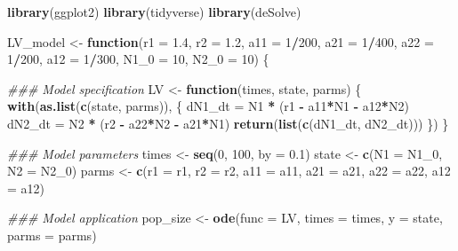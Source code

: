 \documentclass[
]{book}
\newenvironment{Shaded}{\begin{snugshade}}{\end{snugshade}}
\newcommand{\CommentTok}[1]{\textcolor[rgb]{0.56,0.35,0.01}{\textit{#1}}}
\newcommand{\ControlFlowTok}[1]{\textcolor[rgb]{0.13,0.29,0.53}{\textbf{#1}}}
\newcommand{\DataTypeTok}[1]{\textcolor[rgb]{0.13,0.29,0.53}{#1}}
\newcommand{\DecValTok}[1]{\textcolor[rgb]{0.00,0.00,0.81}{#1}}
\newcommand{\FloatTok}[1]{\textcolor[rgb]{0.00,0.00,0.81}{#1}}
\newcommand{\KeywordTok}[1]{\textcolor[rgb]{0.13,0.29,0.53}{\textbf{#1}}}
\newcommand{\NormalTok}[1]{#1}
\newcommand{\OperatorTok}[1]{\textcolor[rgb]{0.81,0.36,0.00}{\textbf{#1}}}
\newcommand{\StringTok}[1]{\textcolor[rgb]{0.31,0.60,0.02}{#1}}
\begin{document}
\begin{Shaded}
\begin{Highlighting}[]
\KeywordTok{library}\NormalTok{(ggplot2)}
\KeywordTok{library}\NormalTok{(tidyverse)}
\KeywordTok{library}\NormalTok{(deSolve)}

\NormalTok{LV_model <-}\StringTok{ }\ControlFlowTok{function}\NormalTok{(}\DataTypeTok{r1 =} \FloatTok{1.4}\NormalTok{, }\DataTypeTok{r2 =} \FloatTok{1.2}\NormalTok{, }\DataTypeTok{a11 =} \DecValTok{1}\OperatorTok{/}\DecValTok{200}\NormalTok{, }\DataTypeTok{a21 =} \DecValTok{1}\OperatorTok{/}\DecValTok{400}\NormalTok{, }\DataTypeTok{a22 =} \DecValTok{1}\OperatorTok{/}\DecValTok{200}\NormalTok{, }\DataTypeTok{a12 =} \DecValTok{1}\OperatorTok{/}\DecValTok{300}\NormalTok{, }\DataTypeTok{N1_0 =} \DecValTok{10}\NormalTok{, }\DataTypeTok{N2_0 =} \DecValTok{10}\NormalTok{) \{}

  \CommentTok{### Model specification}
\NormalTok{  LV <-}\StringTok{ }\ControlFlowTok{function}\NormalTok{(times, state, parms) \{}
    \KeywordTok{with}\NormalTok{(}\KeywordTok{as.list}\NormalTok{(}\KeywordTok{c}\NormalTok{(state, parms)), \{}
\NormalTok{      dN1_dt =}\StringTok{ }\NormalTok{N1 }\OperatorTok{*}\StringTok{ }\NormalTok{(r1 }\OperatorTok{-}\StringTok{ }\NormalTok{a11}\OperatorTok{*}\NormalTok{N1 }\OperatorTok{-}\StringTok{ }\NormalTok{a12}\OperatorTok{*}\NormalTok{N2)}
\NormalTok{      dN2_dt =}\StringTok{ }\NormalTok{N2 }\OperatorTok{*}\StringTok{ }\NormalTok{(r2 }\OperatorTok{-}\StringTok{ }\NormalTok{a22}\OperatorTok{*}\NormalTok{N2 }\OperatorTok{-}\StringTok{ }\NormalTok{a21}\OperatorTok{*}\NormalTok{N1)}
      \KeywordTok{return}\NormalTok{(}\KeywordTok{list}\NormalTok{(}\KeywordTok{c}\NormalTok{(dN1_dt, dN2_dt)))}
\NormalTok{    \})}
\NormalTok{  \}}

  \CommentTok{### Model parameters}
\NormalTok{  times <-}\StringTok{ }\KeywordTok{seq}\NormalTok{(}\DecValTok{0}\NormalTok{, }\DecValTok{100}\NormalTok{, }\DataTypeTok{by =} \FloatTok{0.1}\NormalTok{)}
\NormalTok{  state <-}\StringTok{ }\KeywordTok{c}\NormalTok{(}\DataTypeTok{N1 =}\NormalTok{ N1_}\DecValTok{0}\NormalTok{, }\DataTypeTok{N2 =}\NormalTok{ N2_}\DecValTok{0}\NormalTok{)}
\NormalTok{  parms <-}\StringTok{ }\KeywordTok{c}\NormalTok{(}\DataTypeTok{r1 =}\NormalTok{ r1, }\DataTypeTok{r2 =}\NormalTok{ r2, }\DataTypeTok{a11 =}\NormalTok{ a11, }\DataTypeTok{a21 =}\NormalTok{ a21, }\DataTypeTok{a22 =}\NormalTok{ a22, }\DataTypeTok{a12 =}\NormalTok{ a12)}

  \CommentTok{### Model application}
\NormalTok{  pop_size <-}\StringTok{ }\KeywordTok{ode}\NormalTok{(}\DataTypeTok{func =}\NormalTok{ LV, }\DataTypeTok{times =}\NormalTok{ times, }\DataTypeTok{y =}\NormalTok{ state, }\DataTypeTok{parms =}\NormalTok{ parms)}


\end{Highlighting}
\end{Shaded}
\end{document}
